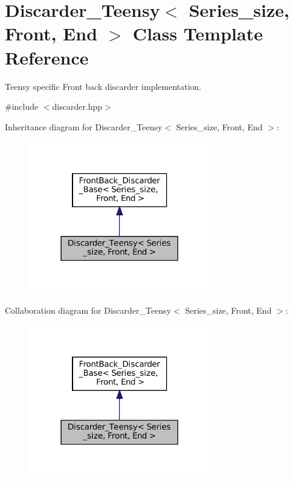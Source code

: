 \hypertarget{classDiscarder__Teensy}{}\section{Discarder\+\_\+\+Teensy$<$ Series\+\_\+size, Front, End $>$ Class Template Reference}
\label{classDiscarder__Teensy}


Teensy specific Front back discarder implementation.  




{\ttfamily \#include $<$discarder.\+hpp$>$}



Inheritance diagram for Discarder\+\_\+\+Teensy$<$ Series\+\_\+size, Front, End $>$\+:
\nopagebreak
\begin{figure}[H]
\begin{center}
\leavevmode
\includegraphics[width=225pt]{classDiscarder__Teensy__inherit__graph}
\end{center}
\end{figure}


Collaboration diagram for Discarder\+\_\+\+Teensy$<$ Series\+\_\+size, Front, End $>$\+:
\nopagebreak
\begin{figure}[H]
\begin{center}
\leavevmode
\includegraphics[width=225pt]{classDiscarder__Teensy__coll__graph}
\end{center}
\end{figure}
